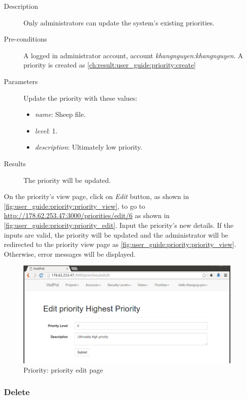 \begin{description}
\item[Description] Only administrators can update the system's existing priorities.
\item[Pre-conditions] A logged in administrator account, \eg account \emph{khangnguyen:khangnguyen}.
A priority is created as \autoref{ch:result:user_guide:priority:create}
\item[Parameters] Update the priority with these values:
\begin{itemize}
\item \emph{name}: Sheep file.
\item \emph{level}: 1.
\item \emph{description}: Ultimately low priority.
\end{itemize}
\item[Results] The priority will be updated.
\end{description}

On the priority's view page, click on \emph{Edit} button, as shown in \autoref{fig:user_guide:priority:priority_view}, 
to go to \href{http://178.62.253.47:3000/priorities/edit/6}{http://178.62.253.47:3000/priorities/edit/6} as shown in \autoref{fig:user_guide:priority:priority_edit}.
Input the priority's new details.
If the inputs are valid, the priority will be updated and the administrator will be redirected to the priority view page as \autoref{fig:user_guide:priority:priority_view}.
Otherwise, error messages will be displayed.

\begin{figure}[bth]
\myfloatalign
\includegraphics[width=1.0\linewidth]{gfx/chapter_5/priority/priority_edit}
\caption[Priority: priority edit page]{Priority: priority edit page}
\label{fig:user_guide:priority:priority_edit}
\end{figure}

\subsubsection{Delete}
\label{ch:result:user_guide:priority:delete}

